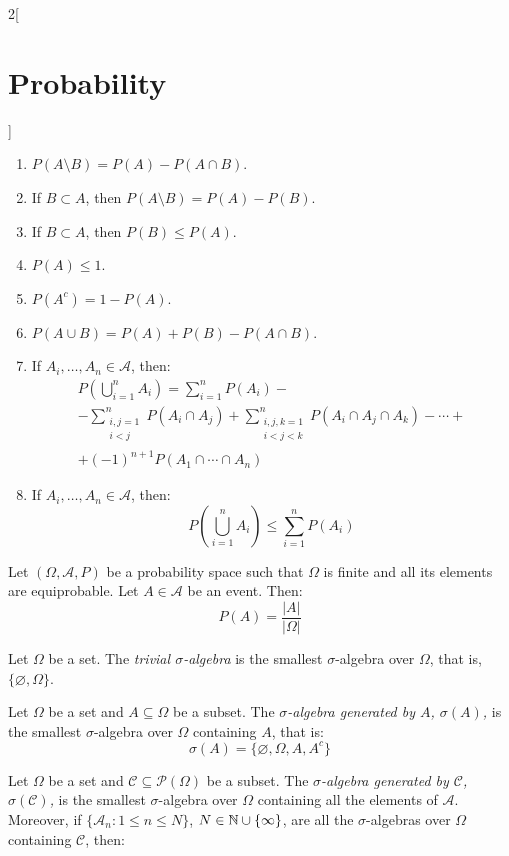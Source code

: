 \documentclass[../../../main.tex]{subfiles}
\begin{document}
\begin{multicols}{2}[\section{Probability}]
\begin{prop}
\begin{enumerate}
      \item $P(A\setminus B) =P(A)-P(A\cap B)$.
      \item If $B\subset A$, then $P(A\setminus B)=P(A)-P(B)$.
      \item If $B\subset A$, then $P(B)\leq P(A)$.
      \item $P(A)\leq 1$.
      \item $P(A^c)=1-P(A)$.
      \item $P(A\cup B) =P(A)+P(B)-P(A\cap B)$.
      \item If $A_i,\ldots,A_n\in\mathcal{A}$, then:
            \begin{multline*}
              P\left(\bigcup_{i=1}^n A_i\right)=\sum_{i=1}^n P(A_i)-\\-\sum_{\substack{i,j=1\\i<j}}^nP(A_i\cap A_j)+\sum_{\substack{i,j,k=1\\i<j<k}}^nP(A_i\cap A_j\cap A_k)-\cdots+\\+{(-1)}^{n+1}P(A_1\cap\cdots\cap A_n)
            \end{multline*}
      \item If $A_i,\ldots,A_n\in\mathcal{A}$, then: $$P\left(\bigcup_{i=1}^n A_i\right)\leq\sum_{i=1}^n P(A_i)$$
    \end{enumerate}
  \end{prop}
  \begin{prop}
    Let $(\Omega,\mathcal{A},P)$ be a probability space such that $\Omega$ is finite and all its elements are equiprobable. Let $A\in\mathcal{A}$ be an event. Then: $$P(A)=\frac{|A|}{|\Omega|}$$
  \end{prop}
  \begin{definition}
    Let $\Omega$ be a set. The \textit{trivial $\sigma$-algebra} is the smallest $\sigma$-algebra over $\Omega$, that is, $\{\varnothing,\Omega\}$.
  \end{definition}
  \begin{definition}
    Let $\Omega$ be a set and $A\subseteq\Omega$ be a subset. The \textit{$\sigma$-algebra generated by $A$, $\sigma(A)$,} is the smallest $\sigma$-algebra over $\Omega$ containing $A$, that is: $$\sigma(A)=\{\varnothing,\Omega,A,A^c\}$$
  \end{definition}
  \begin{definition}
    Let $\Omega$ be a set and $\mathcal{C}\subseteq\mathcal{P}(\Omega)$ be a subset. The \textit{$\sigma$-algebra generated by $\mathcal{C}$, $\sigma(\mathcal{C})$,} is the smallest $\sigma$-algebra over $\Omega$ containing all the elements of $\mathcal{A}$. Moreover, if $\{\mathcal{A}_n:1\leq n\leq N\}$, $N\in\mathbb{N}\cup\{\infty\}$, are all the $\sigma$-algebras over $\Omega$ containing $\mathcal{C}$, then:

\end{definition}
\end{multicols}
\end{document}
